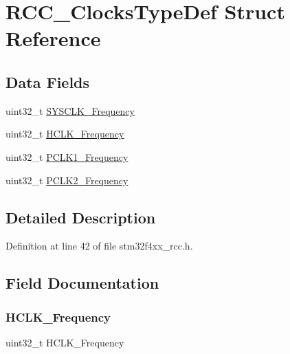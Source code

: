 \hypertarget{struct_r_c_c___clocks_type_def}{}\section{R\+C\+C\+\_\+\+Clocks\+Type\+Def Struct Reference}
\label{struct_r_c_c___clocks_type_def}
\subsection*{Data Fields}
\begin{DoxyCompactItemize}
\item 
uint32\+\_\+t \hyperlink{struct_r_c_c___clocks_type_def_a48b5f04759728e39921969e75c4899e8}{S\+Y\+S\+C\+L\+K\+\_\+\+Frequency}
\item 
uint32\+\_\+t \hyperlink{struct_r_c_c___clocks_type_def_a5f9bf60f522a160aa7a878acf92ce129}{H\+C\+L\+K\+\_\+\+Frequency}
\item 
uint32\+\_\+t \hyperlink{struct_r_c_c___clocks_type_def_a9045b24904bde572d479e85c6d2801f6}{P\+C\+L\+K1\+\_\+\+Frequency}
\item 
uint32\+\_\+t \hyperlink{struct_r_c_c___clocks_type_def_a45ada83b2d388a60ed994451f260f389}{P\+C\+L\+K2\+\_\+\+Frequency}
\end{DoxyCompactItemize}


\subsection{Detailed Description}


Definition at line 42 of file stm32f4xx\+\_\+rcc.\+h.



\subsection{Field Documentation}
\mbox{\label{struct_r_c_c___clocks_type_def_a5f9bf60f522a160aa7a878acf92ce129}} 
\subsubsection{\texorpdfstring{H\+C\+L\+K\+\_\+\+Frequency}{HCLK\_Frequency}}
{\footnotesize\ttfamily uint32\+\_\+t H\+C\+L\+K\+\_\+\+Frequency}

